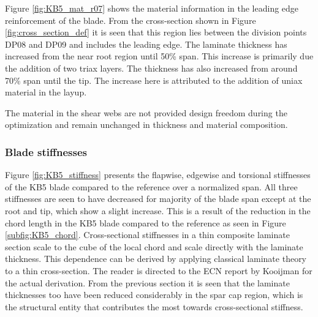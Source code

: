 Figure \ref{fig:KB5_mat_r07} shows the material information in the leading edge reinforcement of the blade. From the cross-section shown in Figure \ref{fig:cross_section_def} it is seen that this region lies between the division points DP08 and DP09 and includes the leading edge. The laminate thickness has increased from the near root region until 50\% span. This increase is primarily due the addition of two triax layers. The thickness has also increased from around 70\% span until the tip. The increase here is attributed to the addition of uniax material in the layup. 

The material in the shear webs are not provided design freedom during the optimization and remain unchanged in thickness and material composition.

\subsubsection*{Blade stiffnesses}
Figure \ref{fig:KB5_stiffness} presents the flapwise, edgewise and torsional stiffnesses of the KB5 blade compared to the reference over a normalized span. All three stiffnesses are seen to have decreased for majority of the blade span except at the root and tip, which show a slight increase. This is a result of the reduction in the chord length in the KB5 blade compared to the reference as seen in Figure \ref{subfig:KB5_chord}. Cross-sectional stiffnesses in a thin composite laminate section scale to the cube of the local chord and scale directly with the laminate thickness. This dependence can be derived by applying classical laminate theory to a thin cross-section. The reader is directed to the ECN report by Kooijman \cite{kooijman1996bending} for the actual derivation. From the previous section it is seen that the laminate thicknesses too have been reduced considerably in the spar cap region, which is the structural entity that contributes the most towards cross-sectional stiffness. 


